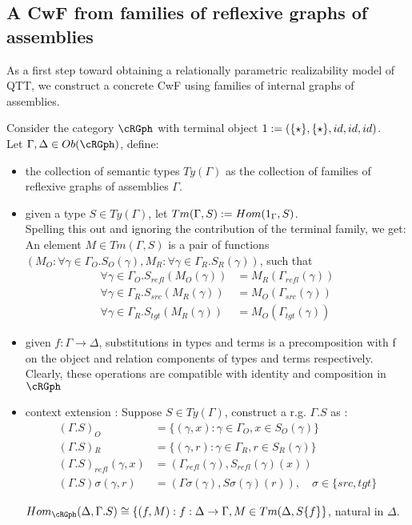 \documentclass[12pt,a4paper]{article}
\def\src{_{src}}\alwaysmath{src}
\def\rfl{_{refl}}\alwaysmath{rfl}
\def\tgt{_{tgt}}\alwaysmath{tgt}
\renewcommand{\O}{_{O}}
\newcommand{\R}{\ensuremath{_{R}}}
\begin{document}
\subsection*{A CwF from families of reflexive graphs of assemblies}
As a first step toward obtaining a relationally parametric realizability model of QTT, we construct a concrete CwF using families of internal graphs of assemblies.

Consider the category $\cRGph$ with terminal object $1 := (\{\star\}, \{\star\}, id, id, id)$.\\
Let $\Gamma, \Delta \in \ob\cRGph$, define: 
\begin{itemize}[noitemsep]
  \item the collection of semantic types $Ty(\Gamma)$ as the collection of families of reflexive graphs of assemblies $\Gamma$.
  
  \item given a type $S \in Ty(\Gamma)$, let $Tm(\Gamma, S) := Hom(1_\Gamma, S)$.\\
  Spelling this out and ignoring the contribution of the terminal family, we get:\\
  An element $M \in Tm(\Gamma, S)$ is a pair of functions $(M\O : \forall \gamma \in \Gamma\O. S\O(\gamma), M\R : \forall \gamma \in \Gamma\R. S\R(\gamma))$, such that 
  \begin{align*}
    \forall \gamma \in \Gamma\O. {S\rfl} (M\O(\gamma)) &= M\R(\Gamma\rfl(\gamma))\\
    \forall \gamma \in \Gamma\R. {S\src} (M\R(\gamma)) &= M\O(\Gamma\src(\gamma))\\
    \forall \gamma \in \Gamma\R. {S\tgt} (M\R(\gamma)) &= M\O(\Gamma\tgt(\gamma))
  \end{align*}
  
  \item given $f : \Gamma \to \Delta$, substitutions in types and terms is a precomposition with f on the object and relation components of types and terms respectively. Clearly, these operations are compatible with identity and composition in $\cRGph$
  
  \item context extension : Suppose $S \in Ty(\Gamma)$, construct a r.g. $\Gamma.S$ as :
  \begin{align*}
    (\Gamma.S)\O &= \{(\gamma, x) : \gamma \in \Gamma\O, x \in S\O(\gamma)\}\\
    (\Gamma.S)\R &= \{(\gamma, r) : \gamma \in \Gamma\R, r \in S\R(\gamma)\}\\
    (\Gamma.S)\rfl(\gamma, x) &= (\Gamma\rfl(\gamma), S\rfl(\gamma)(x))\\
    (\Gamma.S)\sigma(\gamma, r) &= (\Gamma\sigma(\gamma), S\sigma(\gamma)(r)),\quad \sigma \in \{src, tgt\}
  \end{align*}
  \begin{claim}
    $Hom_{\cRGph}(\Delta, \Gamma.S) \cong \{(f,M): f : \Delta \to \Gamma, M \in Tm(\Delta, S\{f\}\}$, natural in $\Delta$.
  \end{claim}
\end{itemize}
\end{document}
